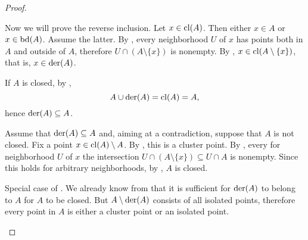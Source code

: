 \begin{proof}
\begin{description}
    Now we will prove the reverse inclusion. Let \( x \in \operatorname{cl}(A) \). Then either \( x \in A \) or \( x \in \operatorname{bd}(A) \). Assume the latter. By , every neighborhood \( U \) of \( x \) has points both in \( A \) and outside of \( A \), therefore \( U \cap (A \setminus \{ x \}) \) is nonempty. By , \( x \in \operatorname{cl}(A \setminus \{ x \}) \), that is, \( x \in \operatorname{der}(A) \).

    \mbox{}
    \begin{description}
      \Implies If \( A \) is closed, by ,
      \begin{equation*}
        A \cup \operatorname{der}(A) = \operatorname{cl}(A) = A,
      \end{equation*}
      hence \( \operatorname{der}(A) \subseteq A \).

      \ImpliedBy Assume that \( \operatorname{der}(A) \subseteq A \) and, aiming at a contradiction, suppose that \( A \) is not closed. Fix a point \( x \in \operatorname{cl}(A) \setminus A \). By , this is a cluster point. By , every for neighborhood \( U \) of \( x \) the intersection \( U \cap (A \setminus \{ x \}) \subseteq U \cap A \) is nonempty. Since this holds for arbitrary neighborhoods, by , \( A \) is closed.
    \end{description}

    \mbox{}
    \begin{description}
      \Implies Special case of .
      \ImpliedBy We already know from  that it is sufficient for \( \operatorname{der}(A) \) to belong to \( A \) for \( A \) to be closed. But \( A \setminus \operatorname{der}(A) \) consists of all isolated points, therefore every point in \( A \) is either a cluster point or an isolated point.
    \end{description}
  \end{description}
\end{proof}

